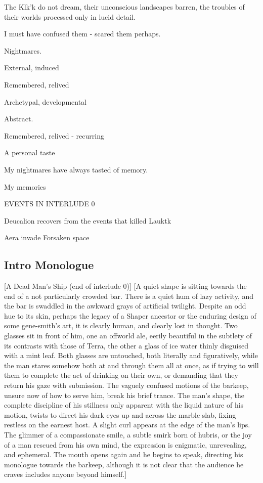 \begin{itemize}
The Klk'k do not dream, their unconscious landscapes barren, the troubles of their worlds processed only in lucid detail.

I must have confused them - scared them perhaps.

Nightmares. 

External, induced

Remembered, relived

Archetypal, developmental

Abstract.

Remembered, relived - recurring

A personal taste

My nightmares have always tasted of memory.

My memories

EVENTS IN INTERLUDE 0

Deucalion recovers from the events that killed Lauktk

Aera invade Forsaken space
\end{itemize}
\subsection{Intro Monologue}

[A Dead Man's Ship (end of interlude 0)] [A quiet shape is sitting
towards the end of a not particularly crowded bar.  There is a quiet
hum of lazy activity, and the bar is swaddled in the awkward grays of
artificial twilight. Despite an odd hue to its skin, perhaps the
legacy of a Shaper ancestor or the enduring design of some
gene-smith's art, it is clearly human, and clearly lost in
thought. Two glasses sit in front of him, one an offworld ale, eerily
beautiful in the subtlety of its contrasts with those of Terra, the
other a glass of ice water thinly disguised with a mint leaf. Both
glasses are untouched, both literally and figuratively, while the man
stares somehow both at and through them all at once, as if trying to
will them to complete the act of drinking on their own, or demanding
that they return his gaze with submission. The vaguely confused
motions of the barkeep, unsure now of how to serve him, break his
brief trance. The man's shape, the complete discipline of his
stillness only apparent with the liquid nature of his motion, twists
to direct his dark eyes up and across the marble slab, fixing restless
on the earnest host. A slight curl appears at the edge of the man's
lips. The glimmer of a compassionate smile, a subtle smirk born of
hubris, or the joy of a man rescued from his own mind, the expression
is enigmatic, unrevealing, and ephemeral. The mouth opens again and he
begins to speak, directing his monologue towards the barkeep, although
it is not clear that the audience he craves includes anyone beyond
himself.]

